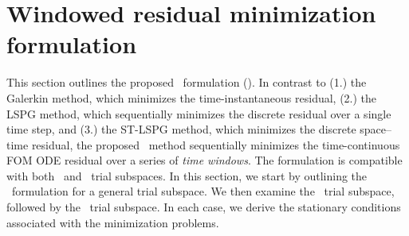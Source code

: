 \section{Windowed residual minimization formulation}\label{sec:tclspg} This section
outlines the proposed \methodNameLower\ 
formulation (\methodAcronym). In contrast to (1.) the Galerkin method, which minimizes the 
time-instantaneous residual, (2.) the LSPG method, which sequentially minimizes the discrete 
residual over a single time step, and (3.) the ST-LSPG method, which minimizes the discrete 
space--time residual, the proposed \methodAcronym\ method sequentially minimizes the 
time-continuous FOM ODE residual over a series of
\textit{time windows}. The formulation is compatible with both \spatialAcronym\ and \spaceTimeAcronym\ trial subspaces. 
In this section, we start by outlining the \methodAcronym\ formulation  
for a general trial subspace. We then examine the \spatialAcronym\ 
trial subspace, followed by the \spaceTimeAcronym\ trial subspace. In each case, we derive the stationary conditions 
associated with the minimization problems.

%

